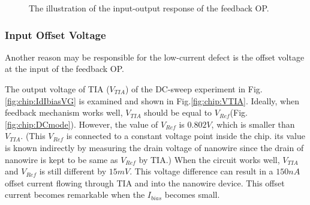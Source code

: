 \begin{figure}[tbh!]
\centering
    \caption{The illustration of the input-output response of the feedback OP.}
    \label{fig:chip:line}
\end{figure}


\subsubsection*{Input Offset Voltage}
Another reason may be responsible for the low-current defect is the offset voltage at the input of the feedback OP.

The output voltage of TIA ($V_{TIA}$) of the DC-sweep experiment in Fig.\ref{fig:chip:IdIbiasVG} is examined and shown in Fig.\ref{fig:chip:VTIA}.
Ideally, when feedback mechanism works well, $V_{TIA}$ should be equal to $V_{Ref}$(Fig.\ref{fig:chip:DCmode}).
However, the value of $V_{Ref}$ is $0.802 V$, which is smaller than $V_{TIA}$.
(This $V_{Ref}$ is connected to a constant voltage point inside the chip.
its value is known indirectly by measuring the drain voltage of nanowire since the drain of nanowire is kept to be same as $V_{Ref}$ by TIA.)
When the circuit works well, $V_{TIA}$ and $V_{Ref}$ is still different by $15m V$.
This voltage difference can result in a $150n A$ offset current flowing through TIA and into the nanowire device.
This offset current becomes remarkable when the $I_{bias}$ becomes small.

